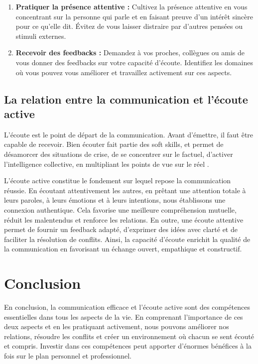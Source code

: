 \documentclass[a4paper, 11pt, oneside]{book}
\begin{document}
\begin{enumerate}
    \item \textbf{Pratiquer la présence attentive :} Cultivez la présence attentive en vous concentrant sur la personne qui parle et en faisant preuve d'un intérêt sincère pour ce qu'elle dit. Évitez de vous laisser distraire par d'autres pensées ou stimuli externes.
     
    \item \textbf{Recevoir des feedbacks :} Demandez à vos proches, collègues ou amis de vous donner des feedbacks sur votre capacité d'écoute. Identifiez les domaines où vous pouvez vous améliorer et travaillez activement sur ces aspects.
\end{enumerate}

\section{La relation entre la communication et l'écoute active}
L’écoute est le point de départ de la communication. Avant d’émettre, il faut être capable de recevoir. Bien écouter fait partie des soft skills, et permet de désamorcer des situations de crise, de se concentrer sur le factuel, d’activer l’intelligence collective, en multipliant les points de vue sur le réel \cite{lefebvre-dalloz}.\par
L'écoute active constitue le fondement sur lequel repose la communication réussie. En écoutant attentivement les autres, en prêtant une attention totale à leurs paroles, à leurs émotions et à leurs intentions, nous établissons une connexion authentique. Cela favorise une meilleure compréhension mutuelle, réduit les malentendus et renforce les relations. En outre, une écoute attentive permet de fournir un feedback adapté, d'exprimer des idées avec clarté et de faciliter la résolution de conflits. Ainsi, la capacité d'écoute enrichit la qualité de la communication en favorisant un échange ouvert, empathique et constructif.



\chapter{Conclusion}
En conclusion, la communication efficace et l'écoute active sont des compétences essentielles dans tous les aspects de la vie. En comprenant l'importance de ces deux aspects et en les pratiquant activement, nous pouvons améliorer nos relations, résoudre les conflits et créer un environnement où chacun se sent écouté et compris. Investir dans ces compétences peut apporter d'énormes bénéfices à la fois sur le plan personnel et professionnel.




\printbibliography
\end{document}
